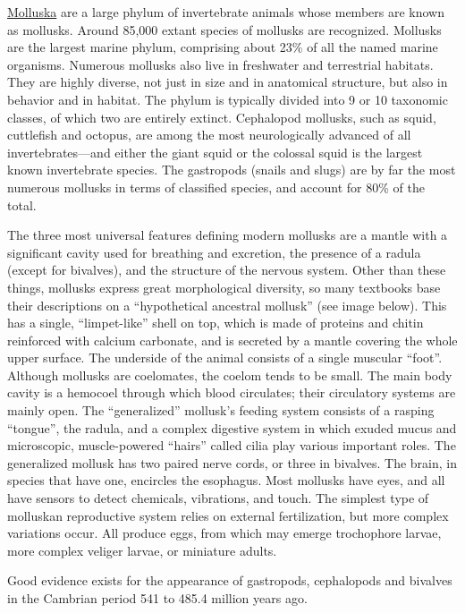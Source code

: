 \href{https://en.wikipedia.org/wiki/Mollusca}{Molluska} are a large
phylum of invertebrate animals whose members are known as mollusks.
Around 85,000 extant species of mollusks are recognized. Mollusks are
the largest marine phylum, comprising about 23\% of all the named marine
organisms. Numerous mollusks also live in freshwater and terrestrial
habitats. They are highly diverse, not just in size and in anatomical
structure, but also in behavior and in habitat. The phylum is typically
divided into 9 or 10 taxonomic classes, of which two are entirely
extinct. Cephalopod mollusks, such as squid, cuttlefish and octopus, are
among the most neurologically advanced of all invertebrates---and either
the giant squid or the colossal squid is the largest known invertebrate
species. The gastropods (snails and slugs) are by far the most numerous
mollusks in terms of classified species, and account for 80\% of the
total.

The three most universal features defining modern mollusks are a mantle
with a significant cavity used for breathing and excretion, the presence
of a radula (except for bivalves), and the structure of the nervous
system. Other than these things, mollusks express great morphological
diversity, so many textbooks base their descriptions on a ``hypothetical
ancestral mollusk'' (see image below). This has a single,
``limpet-like'' shell on top, which is made of proteins and chitin
reinforced with calcium carbonate, and is secreted by a mantle covering
the whole upper surface. The underside of the animal consists of a
single muscular ``foot''. Although mollusks are coelomates, the coelom
tends to be small. The main body cavity is a hemocoel through which
blood circulates; their circulatory systems are mainly open. The
``generalized'' mollusk's feeding system consists of a rasping
``tongue'', the radula, and a complex digestive system in which exuded
mucus and microscopic, muscle-powered ``hairs'' called cilia play
various important roles. The generalized mollusk has two paired nerve
cords, or three in bivalves. The brain, in species that have one,
encircles the esophagus. Most mollusks have eyes, and all have sensors
to detect chemicals, vibrations, and touch. The simplest type of
molluskan reproductive system relies on external fertilization, but more
complex variations occur. All produce eggs, from which may emerge
trochophore larvae, more complex veliger larvae, or miniature adults.

Good evidence exists for the appearance of gastropods, cephalopods and
bivalves in the Cambrian period 541 to 485.4 million years ago.

